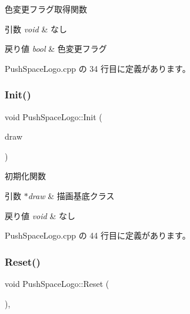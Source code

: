色変更フラグ取得関数 


\begin{DoxyParams}{引数}
{\em void} & なし \\
\hline
\end{DoxyParams}

\begin{DoxyRetVals}{戻り値}
{\em bool} & 色変更フラグ \\
\hline
\end{DoxyRetVals}


 Push\+Space\+Logo.\+cpp の 34 行目に定義があります。

\mbox{\label{class_push_space_logo_a3d4177f8b8124e2f278998c912a8b4d4}} 
\subsubsection{\texorpdfstring{Init()}{Init()}}
{\footnotesize\ttfamily void Push\+Space\+Logo\+::\+Init (\begin{DoxyParamCaption}\item[{\mbox{\hyperlink{class_draw_base}{Draw\+Base}} $\ast$}]{draw }\end{DoxyParamCaption})}



初期化関数 


\begin{DoxyParams}{引数}
{\em $\ast$draw} & 描画基底クラス \\
\hline
\end{DoxyParams}

\begin{DoxyRetVals}{戻り値}
{\em void} & なし \\
\hline
\end{DoxyRetVals}


 Push\+Space\+Logo.\+cpp の 44 行目に定義があります。

\mbox{\label{class_push_space_logo_afa163b1aff8df494b4f09f378bf983f0}} 
\subsubsection{\texorpdfstring{Reset()}{Reset()}}
{\footnotesize\ttfamily void Push\+Space\+Logo\+::\+Reset (\begin{DoxyParamCaption}{ }\end{DoxyParamCaption})\hspace{0.3cm}{\ttfamily [override]}, {\ttfamily [virtual]}}



